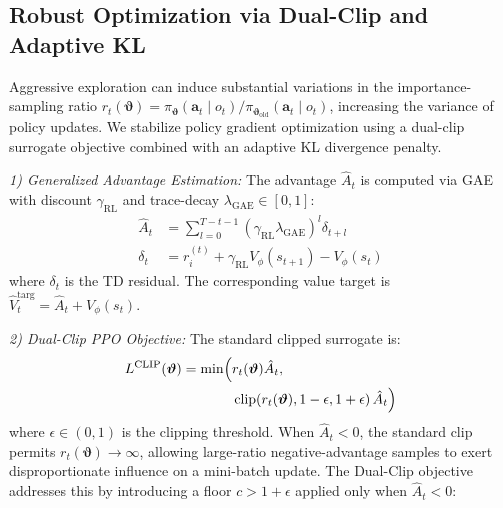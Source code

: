 \documentclass[lettersize,journal]{IEEEtran}
\begin{document}
\subsection{Robust Optimization via Dual-Clip and Adaptive KL}
\label{subsec:dual_clip_kl}

Aggressive exploration
can induce
substantial variations in the importance-sampling ratio
$r_t(\boldsymbol{\vartheta}) =
\pi_{\boldsymbol{\vartheta}}(\mathbf{a}_t \mid o_t) /
\pi_{\boldsymbol{\vartheta}_{\mathrm{old}}}(\mathbf{a}_t \mid o_t)$,
increasing the variance of policy updates.
We stabilize policy gradient optimization using a dual-clip surrogate
objective combined with an adaptive KL divergence penalty.


\emph{1) Generalized Advantage Estimation:} The advantage $\hat{A}_t$ is computed via GAE with discount $\gamma_{\mathrm{RL}}$ and trace-decay $\lambda_{\mathrm{GAE}} \in [0,1]$:
\begin{align}
\hat{A}_t &= \sum_{l=0}^{T-t-1} (\gamma_{\mathrm{RL}}\lambda_{\mathrm{GAE}})^l \delta_{t+l} \label{eq:gae_A} \\
\delta_t &= r_i^{(t)} + \gamma_{\mathrm{RL}} V_\phi(s_{t+1}) - V_\phi(s_t) \label{eq:gae_delta}
\end{align}
where $\delta_t$ is the TD residual. The corresponding value target is $\hat{V}_t^{\mathrm{targ}} = \hat{A}_t + V_\phi(s_t)$.

\emph{2) Dual-Clip PPO Objective:} The standard clipped surrogate is:
\begin{equation}
\label{eq:standard_clip}
\begin{split}
L^{\mathrm{CLIP}}(\boldsymbol{\vartheta}) = \min \Bigl( &r_t(\boldsymbol{\vartheta})\hat{A}_t, \\
&\operatorname{clip}\!\left(r_t(\boldsymbol{\vartheta}), 1-\epsilon, 1+\epsilon\right)\hat{A}_t \Bigr)
\end{split}
\end{equation}
where $\epsilon \in (0,1)$ is the clipping threshold. When
$\hat{A}_t < 0$, the standard clip permits
$r_t(\boldsymbol{\vartheta}) \to \infty$,
allowing large-ratio negative-advantage samples to exert
disproportionate influence on a mini-batch update. The Dual-Clip
objective addresses this by introducing a floor $c > 1+\epsilon$
applied only when $\hat{A}_t < 0$:
\end{document}
